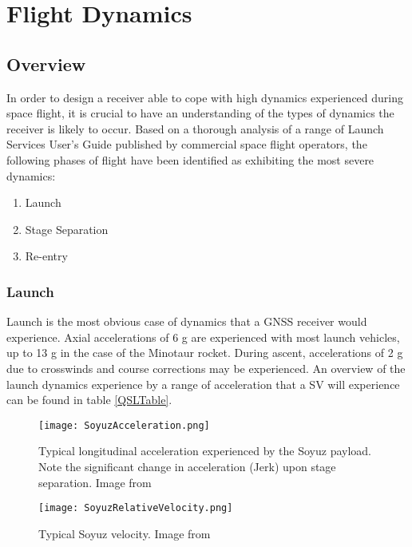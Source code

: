 \chapter{Flight Dynamics}

\section{Overview}
In order to design a receiver able to cope with high dynamics experienced during space flight, it is crucial to have an understanding of the types of dynamics the receiver is likely to occur. Based on a thorough analysis of a range of Launch Services User's Guide published by commercial space flight operators, the following phases of flight have been identified as exhibiting the most severe dynamics: 

\begin{enumerate}
\item{Launch}
\item{Stage Separation}
\item{Re-entry}
\end{enumerate}

\subsection{Launch}
Launch is the most obvious case of dynamics that a \ac{GNSS} receiver would experience. Axial accelerations of 6 g are experienced with most launch vehicles, up to 13 g in the case of the Minotaur rocket. During ascent, accelerations of 2 g due to crosswinds and course corrections may be experienced. An overview of the launch dynamics experience by a range of acceleration that a \ac{SV} will experience can be found in table \ref{QSLTable}.

\begin{figure}[!htb] 
    \centering
    \texttt{[image: SoyuzAcceleration.png]} 
    \caption{Typical longitudinal acceleration experienced by the Soyuz payload. Note the significant change in acceleration (Jerk) upon stage separation. Image from \cite{Soyuz}}
    \label{fig:SoyuzAcceleration}
\end{figure}

\begin{figure}[!htb] 
    \centering
    \texttt{[image: SoyuzRelativeVelocity.png]} 
    \caption{Typical Soyuz velocity. Image from \cite{Soyuz}}
    \label{fig:SoyuzRelativeVelocity}
\end{figure}



